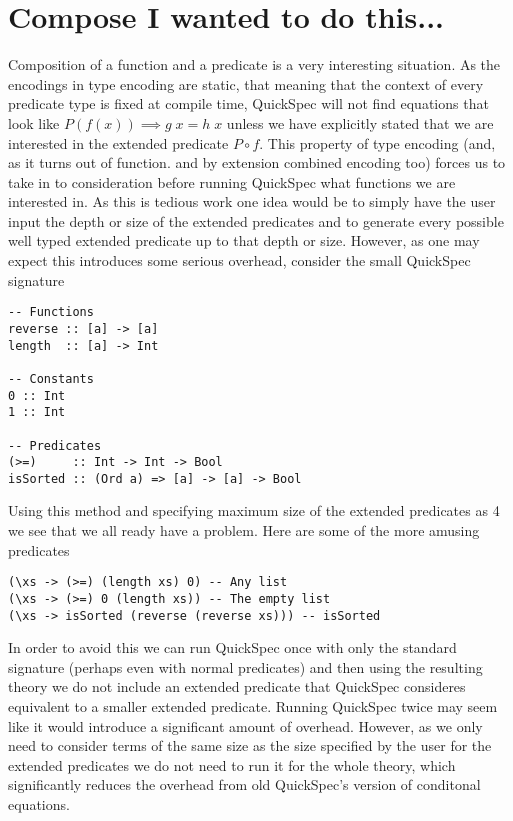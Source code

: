 \section{Compose I wanted to do this...}
Composition of a function and a predicate
is a very interesting situation. As the
encodings in type encoding are static, that meaning
that the context of every predicate type is fixed
at compile time, QuickSpec will not find equations
that look like $P(f(x))\implies g\;x=h\;x$
unless we have explicitly stated that we are interested
in the extended predicate $P \circ f$. This property of type encoding
(and, as it turns out of function. and by extension combined encoding too)
forces us to take in to consideration before running QuickSpec
what functions we are interested in. %
As this is tedious work one idea would be to simply have the user input the depth or size
of the extended predicates and to generate every possible well typed
extended predicate up to that depth or size. However, as one may expect
this introduces some serious overhead, consider the small QuickSpec signature
\begin{verbatim}
-- Functions
reverse :: [a] -> [a]
length  :: [a] -> Int

-- Constants
0 :: Int
1 :: Int

-- Predicates
(>=)     :: Int -> Int -> Bool 
isSorted :: (Ord a) => [a] -> [a] -> Bool
\end{verbatim}
Using this method and specifying maximum size of the extended predicates as 4
we see that we all ready have a problem. Here are some of the more amusing predicates
\begin{verbatim}
(\xs -> (>=) (length xs) 0) -- Any list
(\xs -> (>=) 0 (length xs)) -- The empty list
(\xs -> isSorted (reverse (reverse xs))) -- isSorted
\end{verbatim}
In order to avoid this we can run QuickSpec once with only the standard signature (perhaps even with
normal predicates) and then using the resulting theory we do not include an extended predicate
that QuickSpec consideres equivalent to a smaller extended predicate.
Running QuickSpec twice may seem like it would introduce a significant amount of overhead. However,
as we only need to consider terms of the same size as the size specified by the user for the
extended predicates we do not need to run it for the whole theory, which significantly reduces the overhead
from old QuickSpec's version of conditonal equations.
